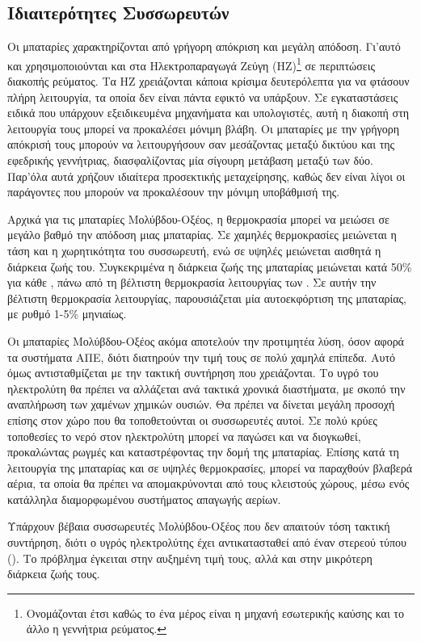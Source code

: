 \documentclass[12pt]{report}
\begin{document}
\subsection{Ιδιαιτερότητες Συσσωρευτών}
Οι μπαταρίες χαρακτηρίζονται από γρήγορη απόκριση και μεγάλη απόδοση. Γι'αυτό και χρησιμοποιούνται και στα Ηλεκτροπαραγωγά Ζεύγη (ΗΖ)\footnote{Ονομάζονται έτσι καθώς το ένα μέρος είναι η μηχανή εσωτερικής καύσης και το άλλο η 
γεννήτρια ρεύματος.} σε περιπτώσεις διακοπής ρεύματος. Τα ΗΖ χρειάζονται κάποια κρίσιμα δευτερόλεπτα για να φτάσουν πλήρη λειτουργία, τα οποία δεν είναι πάντα εφικτό να υπάρξουν. Σε εγκαταστάσεις ειδικά που υπάρχουν εξειδικευμένα 
μηχανήματα και υπολογιστές, αυτή η διακοπή στη λειτουργία τους μπορεί να προκαλέσει μόνιμη βλάβη. Οι μπαταρίες με την γρήγορη απόκρισή τους μπορούν να λειτουργήσουν σαν μεσάζοντας μεταξύ δικτύου και της εφεδρικής γεννήτριας, 
διασφαλίζοντας μία σίγουρη μετάβαση μεταξύ των δύο. Παρ'όλα αυτά χρήζουν ιδιαίτερα προσεκτικής μεταχείρησης, καθώς δεν είναι λίγοι οι παράγοντες που μπορούν να προκαλέσουν την μόνιμη υποβάθμισή της.

Αρχικά για τις μπαταρίες Μολύβδου-Οξέος, η θερμοκρασία μπορεί να μειώσει σε μεγάλο βαθμό την απόδοση μιας μπαταρίας. Σε χαμηλές θερμοκρασίες μειώνεται η τάση και η χωρητικότητα του συσσωρευτή, ενώ σε υψηλές μειώνεται αισθητά η 
διάρκεια ζωής του. Συγκεκριμένα η διάρκεια ζωής της μπαταρίας μειώνεται κατά 50\% για κάθε {}, πάνω από τη βέλτιστη θερμοκρασία λειτουργίας των {}. Σε αυτήν την βέλτιστη θερμοκρασία 
λειτουργίας, παρουσιάζεται μία αυτοεκφόρτιση της μπαταρίας, με ρυθμό 1-5\% μηνιαίως.

Οι μπαταρίες Μολύβδου-Οξέος ακόμα αποτελούν την προτιμητέα λύση, όσον αφορά τα συστήματα ΑΠΕ, διότι διατηρούν την τιμή τους σε πολύ χαμηλά επίπεδα. Αυτό όμως αντισταθμίζεται με την τακτική συντήρηση που χρειάζονται. 
Το υγρό του ηλεκτρολύτη θα πρέπει να αλλάζεται ανά τακτικά χρονικά διαστήματα, με σκοπό την αναπλήρωση των χαμένων χημικών ουσιών. Θα πρέπει να δίνεται μεγάλη προσοχή επίσης στον χώρο που θα τοποθετούνται οι συσσωρευτές αυτοί.
Σε πολύ κρύες τοποθεσίες το νερό στον ηλεκτρολύτη μπορεί να παγώσει και να διογκωθεί, προκαλώντας ρωγμές και καταστρέφοντας την δομή της μπαταρίας. Επίσης κατά τη λειτουργία της μπαταρίας και σε υψηλές θερμοκρασίες, μπορεί να
παραχθούν βλαβερά αέρια, τα οποία θα πρέπει να απομακρύνονται από τους κλειστούς χώρους, μέσω ενός κατάλληλα διαμορφωμένου συστήματος απαγωγής αερίων.
 
Υπάρχουν βέβαια συσσωρευτές Μολύβδου-Οξέος που δεν απαιτούν τόση τακτική συντήρηση, διότι ο υγρός ηλεκτρολύτης έχει αντικατασταθεί από έναν στερεού τύπου ({}). Το πρόβλημα έγκειται στην αυξημένη τιμή τους, αλλά
και στην μικρότερη διάρκεια ζωής τους. 
\end{document}

